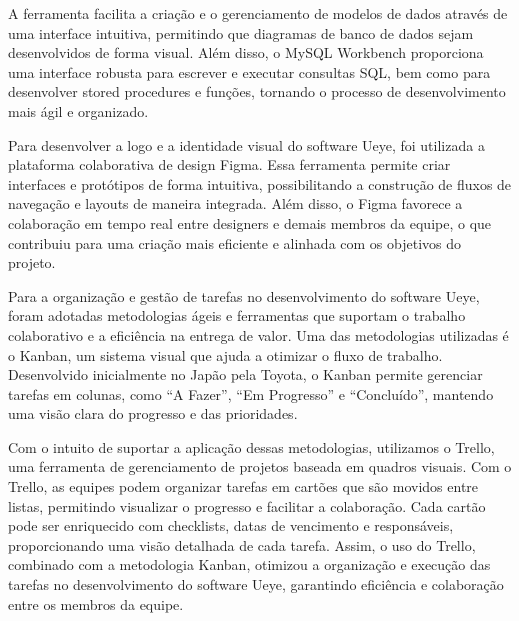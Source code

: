 A ferramenta facilita a criação e o gerenciamento de modelos de dados através de uma interface intuitiva, permitindo que diagramas de banco de dados sejam desenvolvidos de forma visual. Além disso, o MySQL Workbench proporciona uma interface robusta para escrever e executar consultas SQL, bem como para desenvolver stored procedures e funções, tornando o processo de desenvolvimento mais ágil e organizado. \textcite{DNC}

Para desenvolver a logo e a identidade visual do software Ueye, foi utilizada a plataforma colaborativa de design Figma. Essa ferramenta permite criar interfaces e protótipos de forma intuitiva, possibilitando a construção de fluxos de navegação e layouts de maneira integrada. Além disso, o Figma favorece a colaboração em tempo real entre designers e demais membros da equipe, o que contribuiu para uma criação mais eficiente e alinhada com os objetivos do projeto.  \textcite{Alura}

Para a organização e gestão de tarefas no desenvolvimento do software Ueye, foram adotadas metodologias ágeis e ferramentas que suportam o trabalho colaborativo e a eficiência na entrega de valor. Uma das metodologias utilizadas é o Kanban, um sistema visual que ajuda a otimizar o fluxo de trabalho. Desenvolvido inicialmente no Japão pela Toyota, o Kanban permite gerenciar tarefas em colunas, como “A Fazer”, “Em Progresso” e “Concluído”, mantendo uma visão clara do progresso e das prioridades. \textcite{TOTVS}

Com o intuito de suportar a aplicação dessas metodologias, utilizamos o Trello, uma ferramenta de gerenciamento de projetos baseada em quadros visuais. Com o Trello, as equipes podem organizar tarefas em cartões que são movidos entre listas, permitindo visualizar o progresso e facilitar a colaboração. Cada cartão pode ser enriquecido com checklists, datas de vencimento e responsáveis, proporcionando uma visão detalhada de cada tarefa. Assim, o uso do Trello, combinado com a metodologia Kanban, otimizou a organização e execução das tarefas no desenvolvimento do software Ueye, garantindo eficiência e colaboração entre os membros da equipe. \textcite{Magalhães}